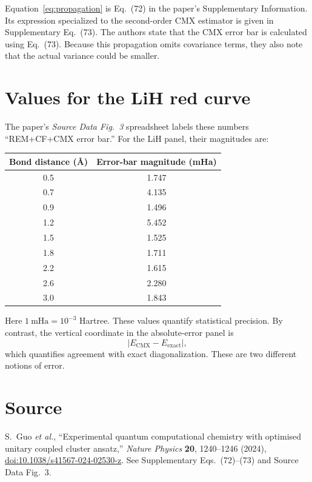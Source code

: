 \documentclass[11pt]{article}
\begin{document}
Equation~\eqref{eq:propagation} is Eq.~(72) in the paper's Supplementary
Information.  Its expression specialized to the second-order CMX estimator is
given in Supplementary Eq.~(73).  The authors state that the CMX error bar is
calculated using Eq.~(73).  Because this propagation omits covariance terms,
they also note that the actual variance could be smaller.

\section*{Values for the LiH red curve}

The paper's \emph{Source Data Fig.~3} spreadsheet labels these numbers
``REM+CF+CMX error bar.''  For the LiH panel, their magnitudes are:

\begin{center}
\begin{tabular}{cc}
\toprule
Bond distance (\AA) & Error-bar magnitude (mHa) \\
\midrule
0.5 & 1.747 \\
0.7 & 4.135 \\
0.9 & 1.496 \\
1.2 & 5.452 \\
1.5 & 1.525 \\
1.8 & 1.711 \\
2.2 & 1.615 \\
2.6 & 2.280 \\
3.0 & 1.843 \\
\bottomrule
\end{tabular}
\end{center}

Here $1~\mathrm{mHa}=10^{-3}$ Hartree.  These values quantify statistical
precision.  By contrast, the vertical coordinate in the absolute-error panel
is
\begin{equation}
  \left|E_{\mathrm{CMX}}-E_{\mathrm{exact}}\right|,
\end{equation}
which quantifies agreement with exact diagonalization.  These are two
different notions of error.

\section*{Source}

S.~Guo \emph{et al.}, ``Experimental quantum computational chemistry with
optimised unitary coupled cluster ansatz,'' \emph{Nature Physics} \textbf{20},
1240--1246 (2024),
\href{https://doi.org/10.1038/s41567-024-02530-z}
{doi:10.1038/s41567-024-02530-z}.  See Supplementary Eqs.~(72)--(73) and
Source Data Fig.~3.
\end{document}
